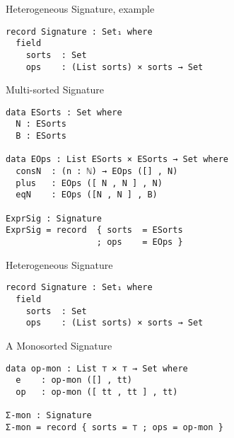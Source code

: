 \documentclass[11pt]{beamer}
\begin{document}
\begin{frame}[fragile]{Heterogeneous Signature, example}
  \begin{block}{}
    \begin{verbatim}
record Signature : Set₁ where 
  field
    sorts  : Set
    ops    : (List sorts) × sorts → Set
    \end{verbatim}
  \end{block}
  \pause

  \begin{block}{Multi-sorted Signature}
    \begin{verbatim}
data ESorts : Set where
  N : ESorts
  B : ESorts
  
data EOps : List ESorts × ESorts → Set where
  consN  : (n : ℕ) → EOps ([] , N)
  plus   : EOps ([ N , N ] , N)
  eqN    : EOps ([N , N ] , B)

ExprSig : Signature
ExprSig = record  { sorts  = ESorts
                  ; ops    = EOps }
    \end{verbatim}

  \end{block}
\end{frame}

\begin{frame}[fragile]{Heterogeneous Signature}
  \begin{block}{}
\begin{verbatim}
record Signature : Set₁ where 
  field
    sorts  : Set
    ops    : (List sorts) × sorts → Set
    \end{verbatim}
  \end{block}


  \begin{block}{A Monosorted Signature}
    \begin{verbatim}
data op-mon : List ⊤ × ⊤ → Set where
  e    : op-mon ([] , tt)
  op   : op-mon ([ tt , tt ] , tt)

Σ-mon : Signature
Σ-mon = record { sorts = ⊤ ; ops = op-mon }
    \end{verbatim}

  \end{block}
\end{frame}
\end{document}
